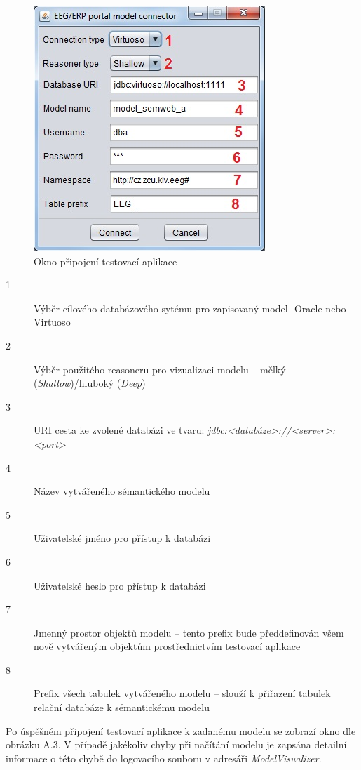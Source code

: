 \documentclass{projekt}
\begin{document}
\begin{figure}[htb!]
\begin{center}
\includegraphics[scale=0.8]{manualTestConnect.jpg}
\caption{Okno připojení testovací aplikace}
\end{center}
\end{figure}

\begin{description}
\item[1] Výběr cílového databázového sytému pro zapisovaný model- Oracle nebo Virtuoso
\item[2] Výběr použitého reasoneru pro vizualizaci modelu – mělký ({\it Shallow})/hluboký ({\it Deep})
\item[3] URI cesta ke zvolené databázi ve tvaru: {\it jdbc:<databáze>://<server>:<port>}
\item[4] Název vytvářeného sémantického modelu
\item[5] Uživatelské jméno pro přístup k databázi
\item[6] Uživatelské heslo pro přístup k databázi
\item[7] Jmenný prostor objektů modelu – tento prefix bude předdefinován všem nově vytvářeným objektům prostřednictvím testovací aplikace 
\item[8] Prefix všech tabulek vytvářeného modelu – slouží k přiřazení tabulek relační databáze k sémantickému modelu
\end{description}


Po úspěšném připojení testovací aplikace k zadanému modelu se zobrazí okno dle obrázku A.3. V případě jakékoliv chyby při načítání modelu je zapsána detailní informace o této chybě do logovacího souboru v adresáři {\it ModelVisualizer}. 
\end{document}
